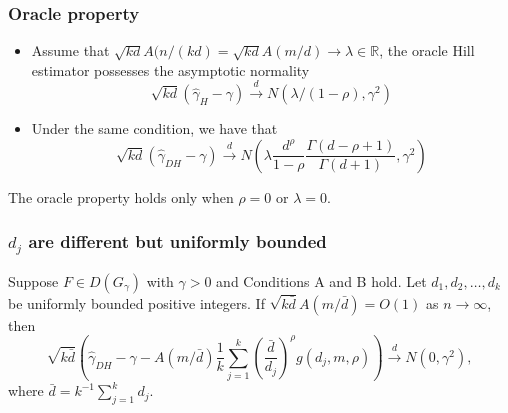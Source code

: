 \documentclass{beamer}
\newcommand{\suit}[1]{\left(#1\right)}
\begin{document}
\begin{frame}
    \frametitle{Oracle property}
\begin{itemize}
    \item Assume that $\sqrt{kd}A(n/(kd)=\sqrt{kd}A(m/d)\to \lambda\in \mathbb{R}$, the oracle Hill estimator possesses the asymptotic normality $$\sqrt{kd}(\hat{\gamma}_H-\gamma) \stackrel{d}{\to} N(\lambda/(1-\rho),\gamma^2)$$
    \item Under the same condition, we have that 
    $$
    \sqrt{kd}(\hat{\gamma}_{DH}-\gamma)\stackrel{d}{\to}N\suit{\lambda\frac{d^{\rho}}{1-\rho}\frac{\Gamma(d-\rho+1)}{\Gamma(d+1)},\gamma^2}
    $$
\end{itemize}
    
\begin{corollary}
    The oracle property holds only when $\rho = 0$ or $\lambda=0$.
\end{corollary}

\end{frame}

\begin{frame}
    \frametitle{$d_j$ are different but uniformly bounded}
\begin{theorem}
    Suppose $F\in D(G_{\gamma})$
  with $\gamma>0$ and Conditions A and  B hold.  Let $d_1,d_2,\dots,d_k$ be uniformly bounded positive integers. If $\sqrt{k\bar{d}}A(m/\bar{d})=O(1)$ as $n \to \infty$, then
  $$
 \sqrt{k\bar{d}}\suit{ \hat{\gamma}_{DH}-\gamma-A(m/\bar{d})\dfrac{1}{k}\sum_{j=1}^k \left(\dfrac{\bar{d}}{d_j}\right)^{\rho} g(d_j,m,\rho) } \stackrel{d}{\to} N(0,\gamma^2),
  $$
where $\bar{d}=k^{-1}\sum_{j=1}^k d_j$.
\end{theorem}
    

\end{frame}
\end{document}

